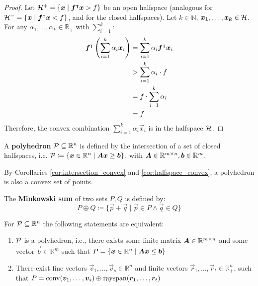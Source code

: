 \begin{proof}
Let $\mathcal{H}^+ = \{{\bm{x}} \mid {\bm{f}}^\intercal {\bm{x}} > f\}$ be an open halfspace (analogous for $\mathcal{H}^- = \{{\bm{x}} \mid {\bm{f}}^\intercal {\bm{x}} < f\}$, and for the closed halfspaces). Let $k \in \mathbb{N}$, ${\bm{x_1}}, \dots, {\bm{x_k}} \in \mathcal{H}$. For any $\alpha_1, \dots, \alpha_k \in \mathbb{R}_+$ with $\sum_{i=1}^{k}$:
\begin{align*}
{\bm{f}}^\intercal \left( \sum_{i=1}^{k} \alpha_i {\bm{x}}_i \right)
&= \sum_{i=1}^{k} \alpha_i {\bm{f}}^\intercal {\bm{x}}_i \\
&> \sum_{i=1}^{k} \alpha_i \cdot f \\
&= f \cdot \sum_{i=1}^{k} \alpha_i \\
&= f
\end{align*}
Therefore, the convex combination $\sum_{i=1}^{k} \alpha_i \vec{x}_i$ is in the halfspace $\mathcal{H}$.
\end{proof}

\begin{definition}
A \textbf{polyhedron} $\mathcal{P} \subseteq \mathbb{R}^n$ is defined by the intersection of a set of closed halfspaces, i.e. $\mathcal{P} \coloneqq \{{\bm{x}} \in \mathbb{R}^n \mid {\bm{A}} {\bm{x}} \geq {\bm{b}}\}$, with ${\bm{A}} \in \mathbb{R}^{m \times n}, {\bm{b}} \in \mathbb{R}^m$.

By Corollaries \ref{cor:intersection_convex} and \ref{cor:halfspace_convex}, a polyhedron is also a convex set of points.
\end{definition}


\begin{definition}
The \textbf{Minkowski sum} of two sets $P, Q$ is defined by:
\begin{equation*}
P \oplus Q \coloneqq \{\vec{p} + \vec{q} \mid \vec{p} \in P \land \vec{q} \in Q\}
\end{equation*}
\end{definition}

\begin{theorem}\label{th:minkowski-weyl}
For $\mathcal{P} \subseteq \mathbb{R}^n$ the following statements are equivalent:
\begin{enumerate}
\item $\mathcal{P}$ is a polyhedron, i.e., there exists some finite matrix ${\bm{A}} \in \mathbb{R}^{m \times n}$ and some vector $\vec{b} \in \mathbb{R}^m$ such that $P = \{{\bm{x}} \in \mathbb{R}^n \mid {\bm{A}} {\bm{x}} \leq {\bm{b}}\}$
\item There exist fine vectors $\vec{v}_1, \dots, \vec{v}_s \in \mathbb{R}^n$ and finite vectors $\vec{r}_1, \dots, \vec{r}_t \in \mathbb{R}_+^n$, such that $P = \operatorname{conv}({\bm{v}}_1, \dots, {\bm{v}}_s) \oplus \operatorname{rayspan}({\bm{r}}_1, \dots, {\bm{r}}_t)$
\end{enumerate}
\end{theorem}

